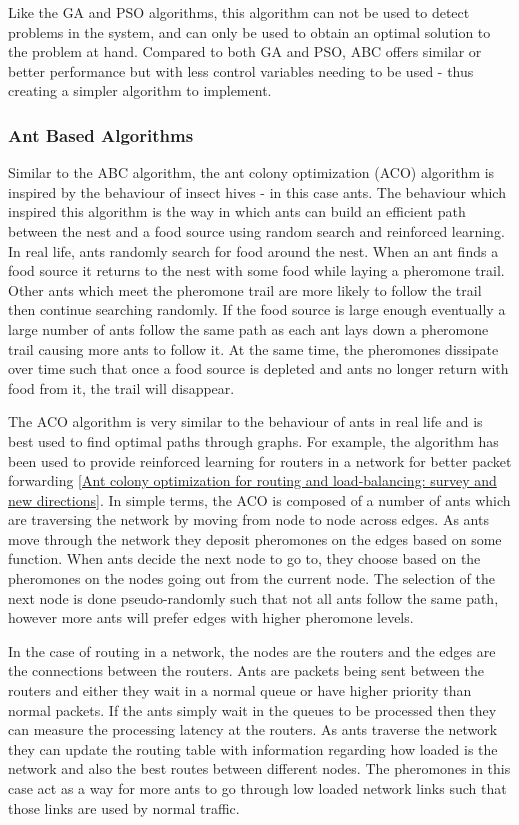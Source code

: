 {Like the GA and PSO algorithms, this algorithm can not be used to detect problems in the system, and can only be used to obtain an optimal solution to the problem at hand. Compared to both GA and PSO, ABC offers similar or better performance but with less control variables needing to be used - thus creating a simpler algorithm to implement.

\subsubsection{Ant Based Algorithms}

Similar to the ABC algorithm, the ant colony optimization (ACO) algorithm is inspired by the behaviour of insect hives - in this case ants. The behaviour which inspired this algorithm is the way in which ants can build an efficient path between the nest and a food source using random search and reinforced learning. In real life, ants randomly search for food around the nest. When an ant finds a food source it returns to the nest with some food while laying a pheromone trail. Other ants which meet the pheromone trail are more likely to follow the trail then continue searching randomly. If the food source is large enough eventually a large number of ants follow the same path as each ant lays down a pheromone trail causing more ants to follow it. At the same time, the pheromones dissipate over time such that once a food source is depleted and ants no longer return with food from it, the trail will disappear. 

The ACO algorithm is very similar to the behaviour of ants in real life and is best used to find optimal paths through graphs. For example, the algorithm has been used to provide reinforced learning for routers in a network for better packet forwarding \ref{Ant colony optimization for routing and load-balancing: survey and new directions}. In simple terms, the ACO is composed of a number of ants which are traversing the network by moving from node to node across edges. As ants move through the network they deposit pheromones on the edges based on some function. When ants decide the next node to go to, they choose based on the pheromones on the nodes going out from the current node. The selection of the next node is done pseudo-randomly such that not all ants follow the same path, however more ants will prefer edges with higher pheromone levels. 

In the case of routing in a network, the nodes are the routers and the edges are the connections between the routers. Ants are packets being sent between the routers and either they wait in a normal queue or have higher priority than normal packets. If the ants simply wait in the queues to be processed then they can measure the processing latency at the routers. As ants traverse the network they can update the routing table with information regarding how loaded is the network and also the best routes between different nodes. The pheromones in this case act as a way for more ants to go through low loaded network links such that those links are used by normal traffic.

}
